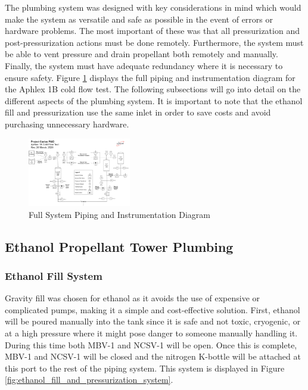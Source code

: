 \documentclass[9pt]{article} %
\numberwithin{equation}{section} %
\begin{document}
The plumbing system was designed with key considerations in mind which would make the system as versatile and safe as possible in the event of errors or hardware problems. The most important of these was that all pressurization and post-pressurization actions must be done remotely. Furthermore, the system must be able to vent pressure and drain propellant both remotely and manually. Finally, the system must have adequate redundancy where it is necessary to ensure safety. Figure \ref{fig:piping_and_instrumentation_diagram} displays the full piping and instrumentation diagram for the Aphlex 1B cold flow test. The following subsections will go into detail on the different aspects of the plumbing system. It is important to note that the ethanol fill and pressurization use the same inlet in order to save costs and avoid purchasing unnecessary hardware.

\begin{figure}[!htb]
    \centering
    \includegraphics[scale=0.5, width=0.4\textwidth, trim={0cm 0cm 0cm 5cm}, clip]{pid} %
    \caption{Full System Piping and Instrumentation Diagram}
    \label{fig:piping_and_instrumentation_diagram}
\end{figure}

\subsection{Ethanol Propellant Tower Plumbing}

\subsubsection{Ethanol Fill System}
\hspace{\parindent} Gravity fill was chosen for ethanol as it avoids the use of expensive or complicated pumps, making it a simple and cost-effective solution. First, ethanol will be poured manually into the tank since it is safe and not toxic, cryogenic, or at a high pressure where it might pose danger to someone manually handling it. During this time both MBV-1 and NCSV-1 will be open. Once this is complete, MBV-1 and NCSV-1 will be closed and the nitrogen K-bottle will be attached at this port to the rest of the piping system. This system is displayed in Figure \ref{fig:ethanol_fill_and_pressurization_system}.
\end{document}
